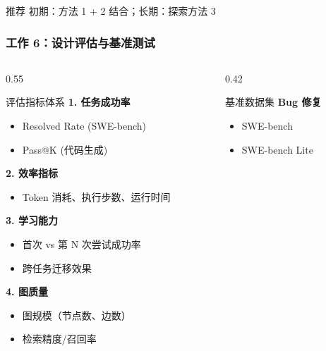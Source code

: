 \documentclass[aspectratio=169,10pt]{beamer}
\begin{document}
\begin{frame}
  \vspace{0.15cm}

  \begin{alertblock}{推荐}
    \footnotesize
    初期：方法 1 + 2 结合；长期：探索方法 3
  \end{alertblock}
\end{frame}

\begin{frame}
  \frametitle{工作 6：设计评估与基准测试}

  \begin{columns}[T]
    \begin{column}{0.55\textwidth}
      \begin{block}{评估指标体系}
        \footnotesize
        \textbf{1. 任务成功率}
        \begin{itemize}
          \item Resolved Rate (SWE-bench)
          \item Pass@K (代码生成)
        \end{itemize}

        \vspace{0.1cm}

        \textbf{2. 效率指标}
        \begin{itemize}
          \item Token 消耗、执行步数、运行时间
        \end{itemize}

        \vspace{0.1cm}

        \textbf{3. 学习能力}
        \begin{itemize}
          \item 首次 vs 第 N 次尝试成功率
          \item 跨任务迁移效果
        \end{itemize}

        \vspace{0.1cm}

        \textbf{4. 图质量}
        \begin{itemize}
          \item 图规模（节点数、边数）
          \item 检索精度/召回率
        \end{itemize}
      \end{block}
    \end{column}

    \begin{column}{0.42\textwidth}
      \begin{block}{基准数据集}
        \footnotesize
        \textbf{Bug 修复}
        \begin{itemize}
          \item SWE-bench
          \item SWE-bench Lite
        \end{itemize}


\end{block}
\end{column}
\end{columns}
\end{frame}
\end{document}
